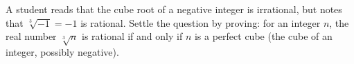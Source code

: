 A student reads that the cube root of a negative integer is irrational, but notes that $\sqrt[3]{-1}=-1$ is rational. Settle the question by proving: for an integer $n$, the real number $\sqrt[3]{n}$ is rational if and only if $n$ is a perfect cube (the cube of an integer, possibly negative).
